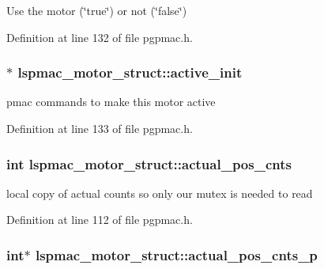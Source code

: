 Use the motor (\char`\"{}true\char`\"{}) or not (\char`\"{}false\char`\"{}) 



Definition at line 132 of file pgpmac.\-h.

\hypertarget{structlspmac__motor__struct_ac2a02f137e4a35db816bc728290d3558}{
\subsubsection[{active\-\_\-init}]{$\ast$ lspmac\-\_\-motor\-\_\-struct\-::active\-\_\-init}}\label{structlspmac__motor__struct_ac2a02f137e4a35db816bc728290d3558}


pmac commands to make this motor active 



Definition at line 133 of file pgpmac.\-h.

\hypertarget{structlspmac__motor__struct_ae5c7aea45b9637a1817be246688fd980}{
\subsubsection[{actual\-\_\-pos\-\_\-cnts}]{\setlength{\rightskip}{0pt plus 5cm}int lspmac\-\_\-motor\-\_\-struct\-::actual\-\_\-pos\-\_\-cnts}}\label{structlspmac__motor__struct_ae5c7aea45b9637a1817be246688fd980}


local copy of actual counts so only our mutex is needed to read 



Definition at line 112 of file pgpmac.\-h.

\hypertarget{structlspmac__motor__struct_a312047bb71def5cd2443fecd875eaea5}{
\subsubsection[{actual\-\_\-pos\-\_\-cnts\-\_\-p}]{\setlength{\rightskip}{0pt plus 5cm}int$\ast$ lspmac\-\_\-motor\-\_\-struct\-::actual\-\_\-pos\-\_\-cnts\-\_\-p}}\label{structlspmac__motor__struct_a312047bb71def5cd2443fecd875eaea5}


